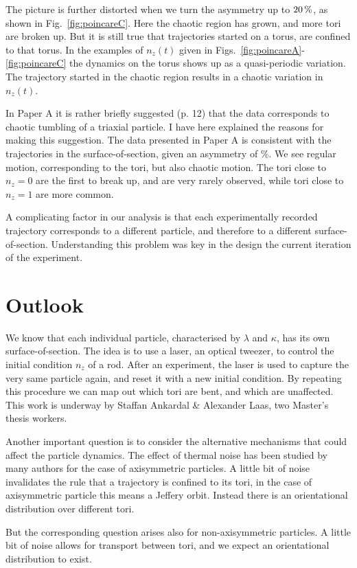 \documentclass[thesis.tex]{subfiles}
\begin{document}
The picture is further distorted when we turn the asymmetry up to $\unit[20]{\%}$, as shown in Fig.~\ref{fig:poincareC}. Here the chaotic region has grown, and more tori are broken up. But it is still true that trajectories started on a torus, are confined to that torus. In the examples of $n_z(t)$ given in Figs.~\ref{fig:poincareA}-\ref{fig:poincareC} the dynamics on the torus shows up as a quasi-periodic variation. The trajectory started in the chaotic region results in a chaotic variation in $n_z(t)$.

In Paper A it is rather briefly suggested (p. 12) that the data corresponds to chaotic tumbling of a triaxial particle. I have here explained the reasons for making this suggestion. The data presented in Paper A is consistent with the trajectories in the surface-of-section, given an asymmetry of \unit[10-30]{\%}. We see regular motion, corresponding to the tori, but also chaotic motion. The tori close to $n_z=0$ are the first to break up, and are very rarely observed, while tori close to $n_z=1$ are more common. 

A complicating factor in our analysis is that each experimentally recorded trajectory corresponds to a different particle, and therefore to a different surface-of-section. Understanding this problem was key in the design the current iteration of the experiment.

\section{Outlook}

We know that each individual particle, characterised by $\lambda$ and $\kappa$, has its own surface-of-section. The idea is to use a laser, an optical tweezer, to control the initial condition $n_z$ of a rod. After an experiment, the laser is used to capture the very same particle again, and reset it with a new initial condition. By repeating this procedure we can map out which tori are bent, and which are unaffected. This work is underway by Staffan Ankardal \& Alexander Laas, two Master's thesis workers.

Another important question is to consider the alternative mechanisms that could affect the particle dynamics. The effect of thermal noise has been studied by many authors for the case of axisymmetric particles. A little bit of noise invalidates the rule that a trajectory is confined to its tori, in the case of axisymmetric particle this means a Jeffery orbit. Instead there is an orientational distribution over different tori.

But the corresponding question arises also for non-axisymmetric particles. A little bit of noise allows for transport between tori, and we expect an orientational distribution to exist.
\end{document}

